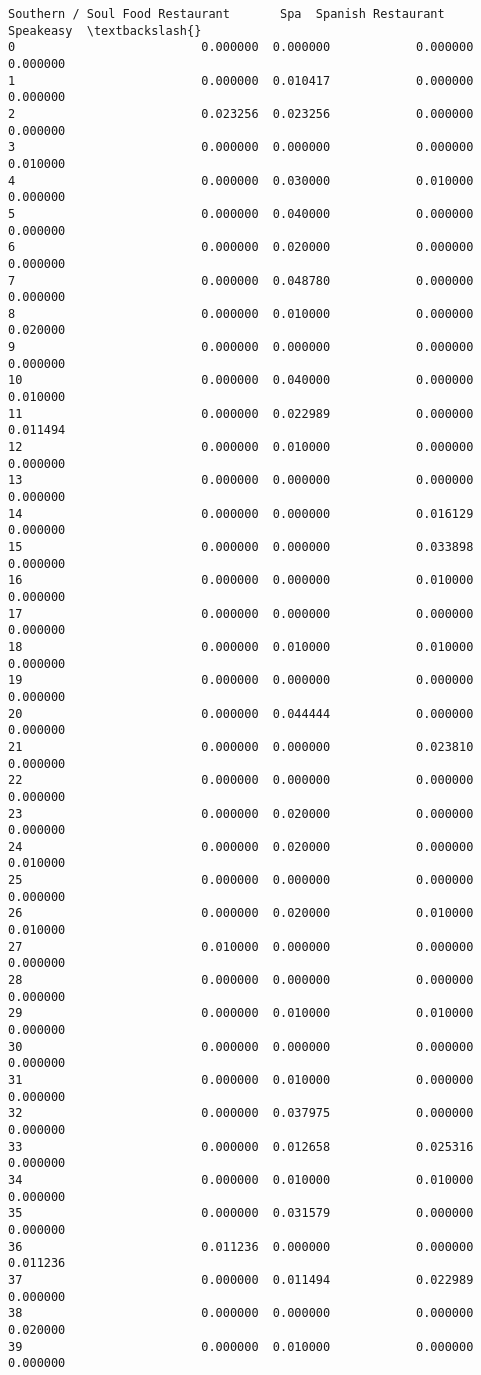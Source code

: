 \documentclass[11pt]{article}
\begin{document}
\begin{tcolorbox}[breakable, size=fbox, boxrule=.5pt, pad at break*=1mm, opacityfill=0]
\begin{Verbatim}[commandchars=\\\{\}]
    Southern / Soul Food Restaurant       Spa  Spanish Restaurant  Speakeasy  \textbackslash{}
0                          0.000000  0.000000            0.000000   0.000000
1                          0.000000  0.010417            0.000000   0.000000
2                          0.023256  0.023256            0.000000   0.000000
3                          0.000000  0.000000            0.000000   0.010000
4                          0.000000  0.030000            0.010000   0.000000
5                          0.000000  0.040000            0.000000   0.000000
6                          0.000000  0.020000            0.000000   0.000000
7                          0.000000  0.048780            0.000000   0.000000
8                          0.000000  0.010000            0.000000   0.020000
9                          0.000000  0.000000            0.000000   0.000000
10                         0.000000  0.040000            0.000000   0.010000
11                         0.000000  0.022989            0.000000   0.011494
12                         0.000000  0.010000            0.000000   0.000000
13                         0.000000  0.000000            0.000000   0.000000
14                         0.000000  0.000000            0.016129   0.000000
15                         0.000000  0.000000            0.033898   0.000000
16                         0.000000  0.000000            0.010000   0.000000
17                         0.000000  0.000000            0.000000   0.000000
18                         0.000000  0.010000            0.010000   0.000000
19                         0.000000  0.000000            0.000000   0.000000
20                         0.000000  0.044444            0.000000   0.000000
21                         0.000000  0.000000            0.023810   0.000000
22                         0.000000  0.000000            0.000000   0.000000
23                         0.000000  0.020000            0.000000   0.000000
24                         0.000000  0.020000            0.000000   0.010000
25                         0.000000  0.000000            0.000000   0.000000
26                         0.000000  0.020000            0.010000   0.010000
27                         0.010000  0.000000            0.000000   0.000000
28                         0.000000  0.000000            0.000000   0.000000
29                         0.000000  0.010000            0.010000   0.000000
30                         0.000000  0.000000            0.000000   0.000000
31                         0.000000  0.010000            0.000000   0.000000
32                         0.000000  0.037975            0.000000   0.000000
33                         0.000000  0.012658            0.025316   0.000000
34                         0.000000  0.010000            0.010000   0.000000
35                         0.000000  0.031579            0.000000   0.000000
36                         0.011236  0.000000            0.000000   0.011236
37                         0.000000  0.011494            0.022989   0.000000
38                         0.000000  0.000000            0.000000   0.020000
39                         0.000000  0.010000            0.000000   0.000000


\end{Verbatim}
\end{tcolorbox}
\end{document}
